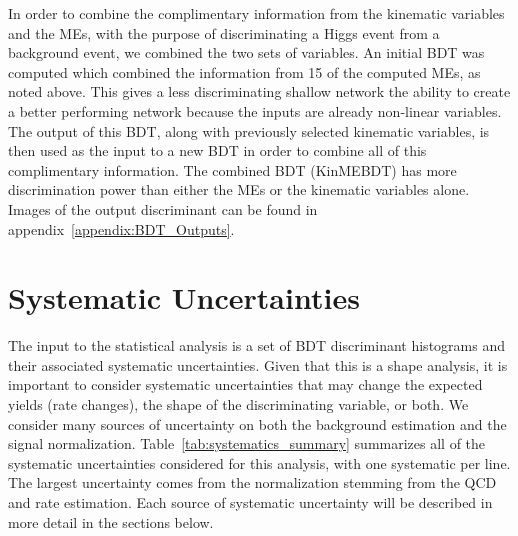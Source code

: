 In order to combine the complimentary information from the kinematic variables and the MEs, with the purpose of discriminating a Higgs event from a background event, we combined the two sets of variables.
An initial BDT was computed which combined the information from 15 of the computed MEs, as noted above.
This gives a less discriminating shallow network the ability to create a better performing network because the inputs are already non-linear variables.
The output of this BDT, along with previously selected kinematic variables, is then used as the input to a new BDT in order to combine all of this complimentary information.
The combined BDT (KinMEBDT) has more discrimination power than either the MEs or the kinematic variables alone.
Images of the output discriminant can be found in appendix~\ref{appendix:BDT_Outputs}.















































\section{Systematic Uncertainties}

The input to the statistical analysis is a set of BDT discriminant histograms and their associated systematic uncertainties.
Given that this is a shape analysis, it is important to consider systematic uncertainties that may change the expected yields (rate changes), the shape of the discriminating variable, or both.
We consider many sources of uncertainty on both the background estimation and the signal normalization.
Table~\ref{tab:systematics_summary} summarizes all of the systematic uncertainties considered for this analysis, with one systematic per line.
The largest uncertainty comes from the \Wjets normalization stemming from the QCD and \Wjets rate estimation.
Each source of systematic uncertainty will be described in more detail in the sections below.

